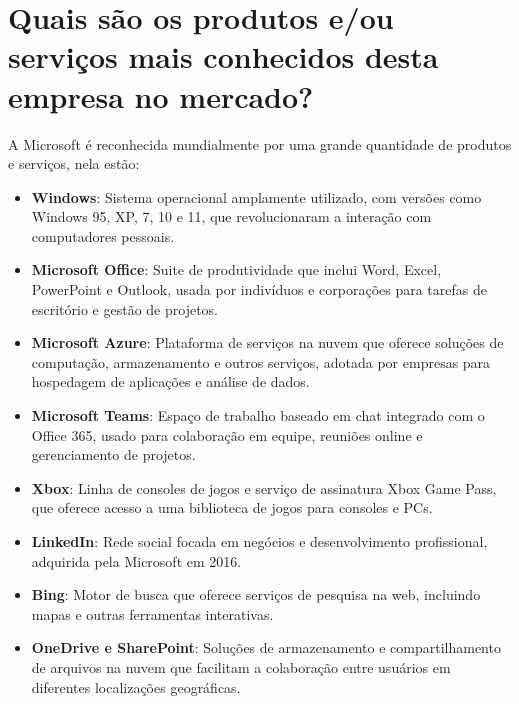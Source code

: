 \section{Quais são os produtos e/ou serviços mais conhecidos desta empresa no mercado?}

A Microsoft é reconhecida mundialmente por uma grande quantidade de produtos e serviços, nela estão:

\begin{itemize}
    \item \textbf{Windows}: Sistema operacional amplamente utilizado, com versões como Windows 95, XP, 7, 10 e 11, que revolucionaram a interação com computadores pessoais.
    \item \textbf{Microsoft Office}: Suite de produtividade que inclui Word, Excel, PowerPoint e Outlook, usada por indivíduos e corporações para tarefas de escritório e gestão de projetos.
    \item \textbf{Microsoft Azure}: Plataforma de serviços na nuvem que oferece soluções de computação, armazenamento e outros serviços, adotada por empresas para hospedagem de aplicações e análise de dados.
    \item \textbf{Microsoft Teams}: Espaço de trabalho baseado em chat integrado com o Office 365, usado para colaboração em equipe, reuniões online e gerenciamento de projetos.
    \item \textbf{Xbox}: Linha de consoles de jogos e serviço de assinatura Xbox Game Pass, que oferece acesso a uma biblioteca de jogos para consoles e PCs.
    \item \textbf{LinkedIn}: Rede social focada em negócios e desenvolvimento profissional, adquirida pela Microsoft em 2016.
    \item \textbf{Bing}: Motor de busca que oferece serviços de pesquisa na web, incluindo mapas e outras ferramentas interativas.
    \item \textbf{OneDrive e SharePoint}: Soluções de armazenamento e compartilhamento de arquivos na nuvem que facilitam a colaboração entre usuários em diferentes localizações geográficas.
\end{itemize}